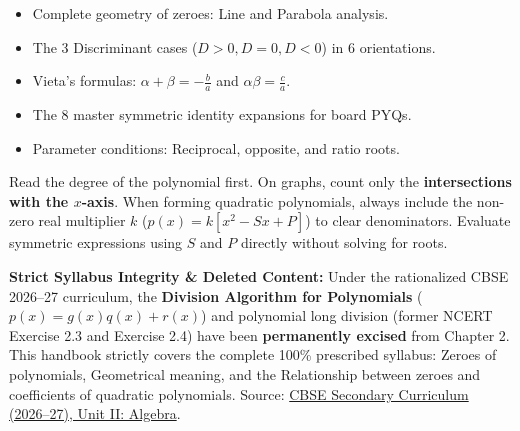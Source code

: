 \documentclass[10pt,a4paper]{article}
\begin{document}
\vspace{3mm}
\begin{minipage}[t]{0.48\textwidth}
  \begin{conceptBox}[title=What this handbook includes,fonttitle=\bfseries\color{navy}]
    \begin{itemize}
      \item Complete geometry of zeroes: Line and Parabola analysis.
      \item The 3 Discriminant cases ($D > 0, D = 0, D < 0$) in $6$ orientations.
      \item Vieta's formulas: $\alpha + \beta = -\frac{b}{a}$ and $\alpha\beta = \frac{c}{a}$.
      \item The 8 master symmetric identity expansions for board PYQs.
      \item Parameter conditions: Reciprocal, opposite, and ratio roots.
    \end{itemize}
  \end{conceptBox}
\end{minipage}\hfill
\begin{minipage}[t]{0.48\textwidth}
  \begin{formulaBox}[title=How to use this handbook,fonttitle=\bfseries\color{navy}]
    \raggedright Read the degree of the polynomial first. On graphs, count only the \textbf{intersections with the $x$-axis}. When forming quadratic polynomials, always include the non-zero real multiplier $k$ ($p(x) = k[x^2 - Sx + P]$) to clear denominators. Evaluate symmetric expressions using $S$ and $P$ directly without solving for roots.
  \end{formulaBox}
\end{minipage}

\vspace{1.5mm}
\begin{warningBox}[title=Official CBSE Curriculum Scope (Academic Year 2026--27),fonttitle=\bfseries\color{navy}]
  \textbf{Strict Syllabus Integrity \& Deleted Content:}
  Under the rationalized CBSE 2026--27 curriculum, the \textbf{Division Algorithm for Polynomials} ($p(x) = g(x)q(x) + r(x)$) and polynomial long division (former NCERT Exercise 2.3 and Exercise 2.4) have been \textbf{permanently excised} from Chapter 2. This handbook strictly covers the complete 100\% prescribed syllabus: Zeroes of polynomials, Geometrical meaning, and the Relationship between zeroes and coefficients of quadratic polynomials.
  {\scriptsize Source: \href{https://cbseacademic.nic.in/web_material/CurriculumMain27/SecPart1/Maths_SecP1X_2026-27.pdf}{CBSE Secondary Curriculum (2026--27), Unit II: Algebra}.}
\end{warningBox}
\end{document}
